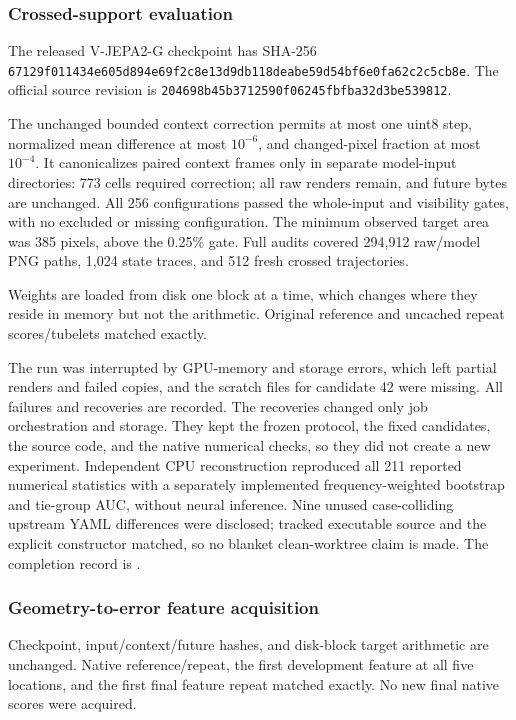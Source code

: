 \subsubsection{Crossed-support evaluation}
The released V-JEPA2-G checkpoint has SHA-256 \texttt{67129f011434e605\allowbreak d894e69f2c8e13d9\allowbreak db118deabe59d54b\allowbreak f6e0fa62c2c5cb8e}. The official source revision is \texttt{204698b45b3712590f06245fbfba32d3be539812}.

The unchanged bounded context correction permits at most one uint8 step, normalized mean difference at most $10^{-6}$, and changed-pixel fraction at most $10^{-4}$. It canonicalizes paired context frames only in separate model-input directories: 773 cells required correction; all raw renders remain, and future bytes are unchanged. All 256 configurations passed the whole-input and visibility gates, with no excluded or missing configuration. The minimum observed target area was 385 pixels, above the 0.25\% gate. Full audits covered 294,912 raw/model PNG paths, 1,024 state traces, and 512 fresh crossed trajectories.

Weights are loaded from disk one block at a time, which changes where they reside in memory but not the arithmetic. Original reference and uncached repeat scores/tubelets matched exactly.

The run was interrupted by GPU-memory and storage errors, which left partial renders and failed copies, and the scratch files for candidate 42 were missing. All failures and recoveries are recorded. The recoveries changed only job orchestration and storage. They kept the frozen protocol, the fixed candidates, the source code, and the native numerical checks, so they did not create a new experiment. Independent CPU reconstruction reproduced all 211 reported numerical statistics with a separately implemented frequency-weighted bootstrap and tie-group AUC, without neural inference. Nine unused case-colliding upstream YAML differences were disclosed; tracked executable source and the explicit constructor matched, so no blanket clean-worktree claim is made. The completion record is .

\subsubsection{Geometry-to-error feature acquisition}
Checkpoint, input/context/future hashes, and disk-block target arithmetic are unchanged. Native reference/repeat, the first development feature at all five locations, and the first final feature repeat matched exactly. No new final native scores were acquired.

